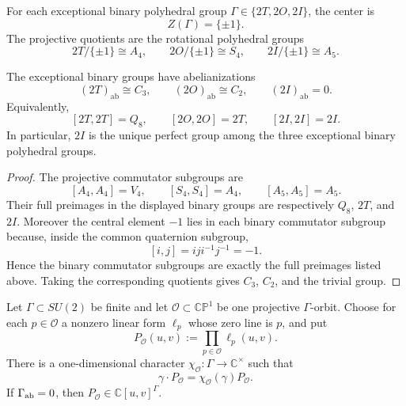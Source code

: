 \documentclass[11pt]{article}
\begin{document}
For each exceptional binary polyhedral group \(\Gamma\in\{2T,2O,2I\}\), the center is
\[
Z(\Gamma)=\{\pm 1\}.
\]
The projective quotients are the rotational polyhedral groups
\begin{equation}
\label{p1:eq:projective-quotients}
2T/\{\pm1\}\cong A_4,\qquad
2O/\{\pm1\}\cong S_4,\qquad
2I/\{\pm1\}\cong A_5.
\end{equation}

\begin{proposition}
\label{p1:prop:exceptional-abelianizations}
The exceptional binary groups have abelianizations
\[
    (2T)_{\mathrm{ab}}\cong C_3,
    \qquad
    (2O)_{\mathrm{ab}}\cong C_2,
    \qquad
    (2I)_{\mathrm{ab}}=0.
\]
Equivalently,
\[
    [2T,2T]=Q_8,
    \qquad
    [2O,2O]=2T,
    \qquad
    [2I,2I]=2I.
\]
In particular, \(2I\) is the unique perfect group among the three exceptional
binary polyhedral groups.
\end{proposition}

\begin{proof}
The projective commutator subgroups are
\[
    [A_4,A_4]=V_4,
    \qquad
    [S_4,S_4]=A_4,
    \qquad
    [A_5,A_5]=A_5.
\]
Their full preimages in the displayed binary groups are respectively
\(Q_8\), \(2T\), and \(2I\).  Moreover the central element \(-1\) lies in
each binary commutator subgroup because, inside the common quaternion subgroup,
\[
    [i,j]=iji^{-1}j^{-1}=-1.
\]
Hence the binary commutator subgroups are exactly the full preimages listed
above.  Taking the corresponding quotients gives \(C_3\), \(C_2\), and the
trivial group.
\end{proof}

\begin{lemma}
\label{p1:lem:projective-orbit-product-character}
Let \(\Gamma\subset SU(2)\) be finite and let
\(\mathcal O\subset\mathbb {CP}^1\) be one projective \(\Gamma\)-orbit.
Choose for each \(p\in\mathcal O\) a nonzero linear form \(\ell_p\) whose
zero line is \(p\), and put
\[
 P_{\mathcal O}(u,v):=\prod_{p\in\mathcal O}\ell_p(u,v).
\]
There is a one-dimensional character
\(\chi_{\mathcal O}:\Gamma\to\mathbb C^\times\) such that
\begin{equation}
\label{p1:eq:projective-orbit-semi-invariant}
 \gamma\cdot P_{\mathcal O}
 =\chi_{\mathcal O}(\gamma)P_{\mathcal O}.
\end{equation}
If \(\Gamma_{\rm ab}=0\), then
\(P_{\mathcal O}\in\mathbb C[u,v]^\Gamma\).
\end{lemma}
\end{document}
